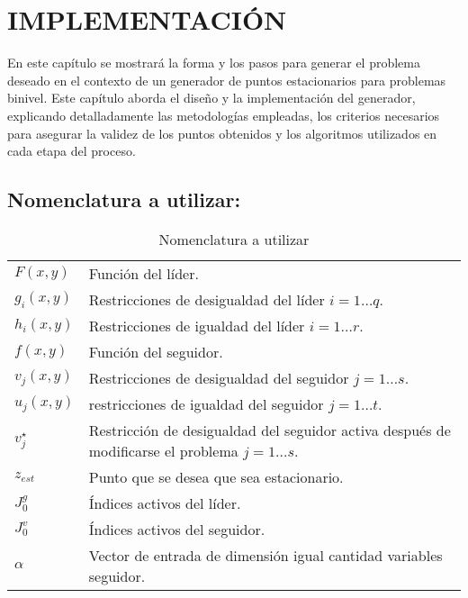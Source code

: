 \chapter{IMPLEMENTACIÓN}
En este capítulo se mostrará la forma y los pasos para generar el problema deseado en el contexto de un generador de puntos estacionarios para problemas binivel. Este capítulo aborda el diseño y la implementación del generador, explicando detalladamente las metodologías empleadas, los criterios necesarios para asegurar la validez de los puntos obtenidos y los algoritmos utilizados en cada etapa del proceso.

\section{Nomenclatura a utilizar:}
\begin{table}[H]
    \centering
    \caption{Nomenclatura a utilizar}
    \begin{tabular}{l m{360pt}}
        $ F(x,y) $              & Función del líder.                                                                                                          \\
        $ g_i(x,y) $              & Restricciones de desigualdad del líder   $ i=1\ldots q$.                                                                                                        \\
        $ h_i(x,y) $                 & Restricciones de igualdad del líder   $ i=1\ldots r$.                    \\
        $ f(x,y) $           & Función del seguidor.                                                               \\
        $ v_j(x,y) $              &  Restricciones de desigualdad del seguidor $j=1\ldots s$.   \\
        $ u_j(x,y) $     & restricciones de igualdad del seguidor $j=1\ldots t$. \\
        $ v_{j}^{\star} $    & Restricción de desigualdad del seguidor activa después de modificarse el problema   $j=1\ldots s$.          \\
        $z_{est}$         & Punto que se desea que sea estacionario.\\
        $J_0^g$             & Índices activos del líder. \\
        $J_0^v$                & Índices activos del seguidor. \\
        $ \alpha  $             & Vector de entrada de dimensión igual cantidad variables seguidor.                                                                                                      \\

\end{tabular}
\end{table}
